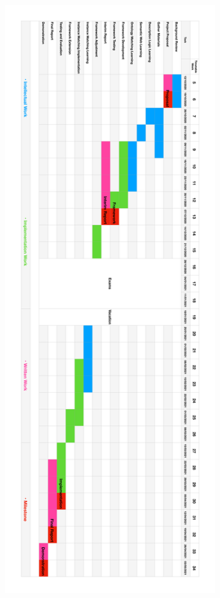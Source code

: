 \begin{figure}[ht]
\begin{subfigure}[ht]{0.5\textwidth}
\includegraphics[width=\textwidth]{img/Gantt_old.pdf}

\end{subfigure}
\end{figure}
